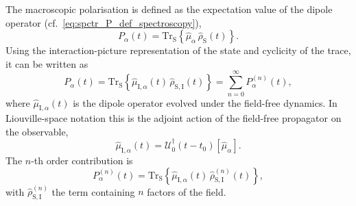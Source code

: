 The macroscopic polarisation is defined as the expectation value of the dipole operator (cf.~\autoref{eq:spctr_P_def_spectroscopy}),
\begin{equation*}
	P_\alpha(t)
	= \mathrm{Tr}_{\mathrm{S}}\!\left\{\hat{\mu}_\alpha\,\hat{\rho}_{\mathrm{S}}(t)\right\}.
\end{equation*}
Using the interaction-picture representation of the state and cyclicity of the trace, it can be written as
\begin{equation*}
	P_\alpha(t)
	= \mathrm{Tr}_{\mathrm{S}}\!\left\{\hat{\mu}_{\mathrm I,\alpha}(t)\,\hat{\rho}_{\mathrm{S,I}}(t)\right\}
	= \sum_{n=0}^{\infty} P^{(n)}_\alpha(t),
\end{equation*}
where $\hat{\mu}_{\mathrm I,\alpha}(t)$ is the dipole operator evolved under the field-free dynamics. In Liouville-space notation this is the adjoint action of the field-free propagator on the observable,
\begin{equation*}
	\hat{\mu}_{\mathrm I,\alpha}(t)=\mathcal{U}_0^{\dagger}(t-t_0)[\hat{\mu}_\alpha].
\end{equation*}
The $n$-th order contribution is
\begin{equation*}
	P^{(n)}_\alpha(t) = \mathrm{Tr}_{\mathrm{S}}\!\left\{\hat{\mu}_{\mathrm I,\alpha}(t)\,\hat{\rho}_{\mathrm{S,I}}^{(n)}(t)\right\},
\end{equation*}
with $\hat{\rho}_{\mathrm{S,I}}^{(n)}$ the term containing $n$ factors of the field.

